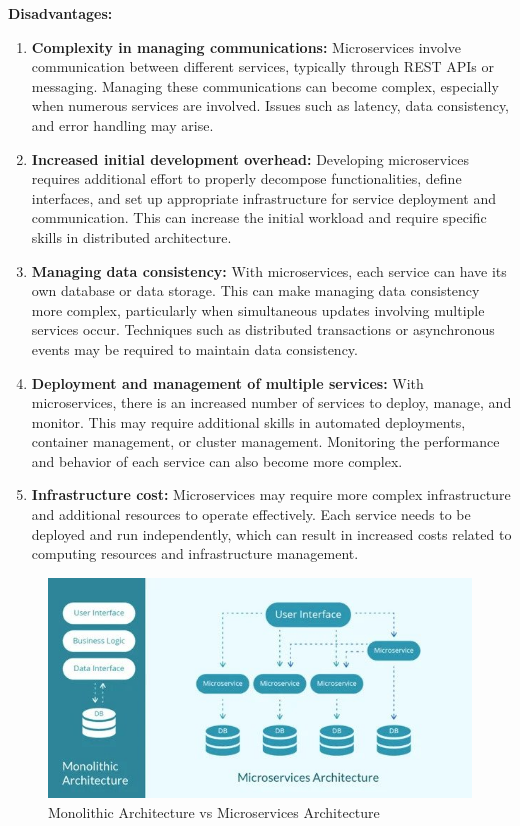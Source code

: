 \textbf{Disadvantages:}
\begin{enumerate}
\item \textbf{Complexity in managing communications:} Microservices involve communication between different services, typically through REST APIs or messaging. Managing these communications can become complex, especially when numerous services are involved. Issues such as latency, data consistency, and error handling may arise.
\item \textbf{Increased initial development overhead:} Developing microservices requires additional effort to properly decompose functionalities, define interfaces, and set up appropriate infrastructure for service deployment and communication. This can increase the initial workload and require specific skills in distributed architecture.
\item \textbf{Managing data consistency:} With microservices, each service can have its own database or data storage. This can make managing data consistency more complex, particularly when simultaneous updates involving multiple services occur. Techniques such as distributed transactions or asynchronous events may be required to maintain data consistency.
\item \textbf{Deployment and management of multiple services:} With microservices, there is an increased number of services to deploy, manage, and monitor. This may require additional skills in automated deployments, container management, or cluster management. Monitoring the performance and behavior of each service can also become more complex.
\item \textbf{Infrastructure cost:} Microservices may require more complex infrastructure and additional resources to operate effectively. Each service needs to be deployed and run independently, which can result in increased costs related to computing resources and infrastructure management.
\end{enumerate}

\begin{figure}[H]
\centering
\includegraphics[width=0.6\linewidth]{images/monolithicvsmicroservice.jpg}
\caption{Monolithic Architecture vs Microservices Architecture}\label{fig:monolithicvsmicroservice}
\end{figure}

